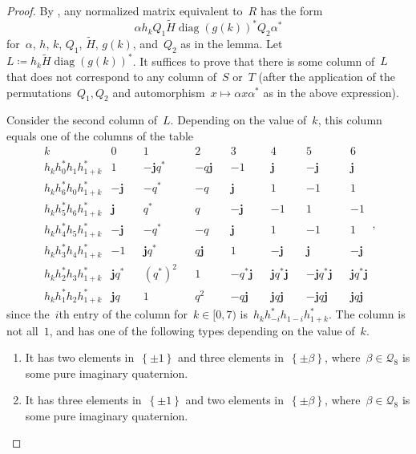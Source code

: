 \documentclass[10pt,a4paper]{amsart}
\DeclareMathOperator{\diag}{diag}
\newcommand{\Q}{\mathcal{Q}}
\newcommand{\adjoint}{*}
\newcommand{\eqdef}{\coloneqq}
\newcommand{\qj}{\mathbf{j}}
\newcommand{\set}[1]{\left\{ #1 \right\}}
\newcommand{\tH}{\widetilde{H}}
\begin{document}
\begin{proof}
By , any normalized matrix equivalent to~$R$ has the form
\[
\alpha h_k Q_1 \tH \diag(g(k))^\adjoint Q_2 \alpha^*
\]
for~$\alpha$, $h$, $k$, $Q_1$, $\tH$, $g(k)$, and~$Q_2$ as in the lemma. Let~$L \eqdef h_k \tH \diag(g(k))^\adjoint $.
It suffices to prove that there is some column of~$L$ that does not correspond to any column of~$S$ or~$T$ (after the application of the permutations~$Q_1, Q_2$ and automorphism~$x \mapsto \alpha x \alpha^*$ as in the above expression).

Consider the second column of~$L$.
Depending on the value of~$k$, this column equals one of the columns of the table
\begin{equation}
\label{eq-2nd-column}
\begin{array}{c|cccccccccccccc}
k & 0 && 1 && 2 && 3 && 4 && 5 && 6 \\
\hline
h_k h_{0}^* h_{1} h_{1+k}^*  & 1 && -\qj q^* && -q \qj && -1 && \qj && -\qj && \qj \\
h_k h_{6}^* h_{0} h_{1+k}^*  & -\qj && -q^* && -q && \qj && 1 && -1 && 1 \\
h_k h_{5}^* h_{6} h_{1+k}^*  & \qj && q^* && q && -\qj && -1 && 1 && -1 \\
h_k h_{4}^* h_{5} h_{1+k}^*  & -\qj && -q^* && -q && \qj && 1 && -1 && 1 \\
h_k h_{3}^* h_{4} h_{1+k}^*  & -1 && \qj q^* && q \qj && 1 && -\qj && \qj && -\qj \\
h_k h_{2}^* h_{3} h_{1+k}^*  & \qj q^* && (q^*)^2 && 1 && -q^* \qj && \qj q^* \qj && -\qj q^* \qj && \qj q^* \qj \\
h_k h_{1}^* h_{2} h_{1+k}^*  & \qj q  && 1 && q^2 && -q \qj && \qj q \qj && -\qj q \qj && \qj q \qj 
\end{array},
\end{equation}
since the~$i$th entry of the column for~$k \in [0,7)$ is~$h_k h_{-i}^* h_{1-i} h_{1+k}^*$.
The column is not all~$1$, and has one of the following types depending on the value of~$k$. 
\begin{enumerate}
\item \label{item-p1}
It has two elements in~$\set{\pm 1}$ and three elements in~$\set{ \pm \beta}$, where~$\beta \in \Q_8$ is some pure imaginary quaternion.

\item \label{item-p2}
It has three elements in~$\set{\pm 1}$ and two elements in~$\set{ \pm \beta}$, where~$\beta \in \Q_8$ is some pure imaginary quaternion.


\end{enumerate}
\end{proof}
\end{document}
